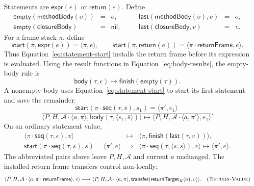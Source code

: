 \documentclass[11pt]{article}
\numberwithin{equation}{section}
\newcommand{\kw}[1]{\ensuremath{\mathsf{#1}}}
\newcommand{\nil}{\kw{nil}}
\newcommand{\rulelabel}[1]{\textsc{#1}}
\begin{document}
Statements are $\kw{expr}(e)$ or $\kw{return}(e)$.  Define
\begin{equation}\label{eq:body-results}
\begin{array}{rclcrcl}
 \mathsf{empty}(\kw{methodBody}(o))&=&o,&\quad&
 \mathsf{last}(\kw{methodBody}(o),v)&=&o,\\
 \mathsf{empty}(\kw{closureBody})&=&\nil,&&
 \mathsf{last}(\kw{closureBody},v)&=&v.
\end{array}
\end{equation}
For a frame stack $\pi$, define
\begin{equation}\label{eq:statement-start}
 \mathsf{start}(\pi,\kw{expr}(e))=\langle\pi,e\rangle,
 \qquad
 \mathsf{start}(\pi,\kw{return}(e))
    =\langle\pi\cdot\kw{returnFrame},e\rangle.
\end{equation}
Thus Equation~\eqref{eq:statement-start} installs the return frame before its
expression is evaluated.  Using the result functions in
Equation~\eqref{eq:body-results}, the empty-body rule is
\begin{equation}\label{eq:empty-body}
 \kw{body}(\tau,\epsilon)\longmapsto\kw{finish}(\mathsf{empty}(\tau)).
\end{equation}
A nonempty body uses Equation~\eqref{eq:statement-start} to start its first
statement and save the remainder:
\begin{equation}\label{eq:nonempty-body}
\dfrac{\mathsf{start}(\pi\cdot\kw{seq}(\tau,\bar s),s_1)
       =\langle\pi',e_1\rangle}
 {
 \langle P,H,\mathcal A\cdot\langle a,\pi\rangle,
       \kw{body}(\tau,\langle s_1,\bar s\rangle)\rangle
 \longmapsto
 \langle P,H,\mathcal A\cdot\langle a,\pi'\rangle,e_1\rangle}.
\end{equation}
On an ordinary statement value,
\begin{equation}\label{eq:statement-continuations}
\begin{array}{rcl}
 \langle\pi\cdot\kw{seq}(\tau,\epsilon),v\rangle
 &\longmapsto&\langle\pi,\kw{finish}(\mathsf{last}(\tau,v))\rangle,\\
 \mathsf{start}(\pi\cdot\kw{seq}(\tau,\bar s),s)
   =\langle\pi',e\rangle
 &\Longrightarrow&
 \langle\pi\cdot\kw{seq}(\tau,\langle s,\bar s\rangle),v\rangle
   \longmapsto\langle\pi',e\rangle.
\end{array}
\end{equation}
The abbreviated pairs above leave $P,H,\mathcal A$ and current $a$ unchanged.
The installed return frame transfers control non-locally:
\[
 \langle P,H,\mathcal A\cdot\langle a,\pi\cdot\kw{returnFrame}\rangle,v\rangle
 \longmapsto
 \langle P,H,\mathcal A\cdot\langle a,\pi\rangle,
    \kw{transfer}(\mathsf{returnTarget}_H(a),v)\rangle.
 \quad(\rulelabel{Return-Value})
\]
\end{document}
